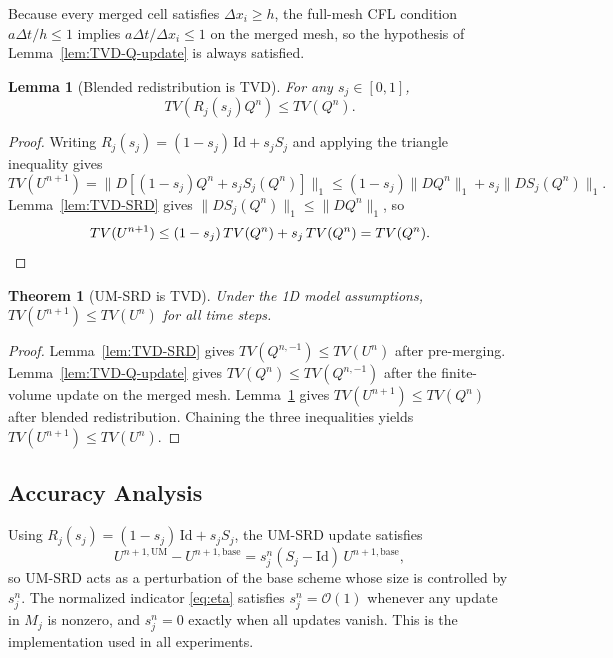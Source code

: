 \documentclass[11pt]{article}
\newtheorem{theorem}{Theorem}
\newtheorem{lemma}{Lemma}
\begin{document}
Because every merged cell satisfies $\Delta x_i \ge h$, the full-mesh CFL
condition $a\Delta t/h \le 1$ implies $a\Delta t/\Delta x_i \le 1$ on the
merged mesh, so the hypothesis of Lemma~\ref{lem:TVD-Q-update} is always
satisfied.

\begin{lemma}[Blended redistribution is TVD]
\label{lem:TVD-R}
For any $s_j \in [0,1]$,
\[
  TV\!\left(R_j(s_j) Q^n\right) \le TV(Q^n).
\]
\end{lemma}

\begin{proof}
Writing $R_j(s_j) = (1-s_j)\,\mathrm{Id} + s_j S_j$ and applying the 
triangle inequality gives
\[
  TV(U^{n+1})
  = \|D[(1-s_j)Q^n + s_j S_j(Q^n)]\|_1
  \le (1-s_j)\|DQ^n\|_1 + s_j\|DS_j(Q^n)\|_1.
\]
Lemma~\ref{lem:TVD-SRD} gives $\|DS_j(Q^n)\|_1 \le \|DQ^n\|_1$, so
\[
  TV(U^{n+1}) \le (1-s_j)\,TV(Q^n) + s_j\,TV(Q^n) = TV(Q^n). \qedhere
\]
\end{proof}

\begin{theorem}[UM-SRD is TVD]
\label{thm:TVD-UMSRD}
Under the 1D model assumptions, $TV(U^{n+1}) \le TV(U^n)$ for all time
steps.
\end{theorem}

\begin{proof}
Lemma~\ref{lem:TVD-SRD} gives $TV(Q^{n,-1}) \le TV(U^n)$ after 
pre-merging. Lemma~\ref{lem:TVD-Q-update} gives $TV(Q^n) \le 
TV(Q^{n,-1})$ after the finite-volume update on the merged mesh. 
Lemma~\ref{lem:TVD-R} gives $TV(U^{n+1}) \le TV(Q^n)$ after blended 
redistribution. Chaining the three inequalities yields $TV(U^{n+1}) \le 
TV(U^n)$.
\end{proof}

\subsection{Accuracy Analysis}
\label{sec:accuracy}

Using $R_j(s_j) = (1-s_j)\,\mathrm{Id} + s_j S_j$, the UM-SRD update 
satisfies
\begin{equation}
  U^{n+1,\mathrm{UM}} - U^{n+1,\mathrm{base}}
  = s_j^n (S_j - \mathrm{Id})\, U^{n+1,\mathrm{base}},
  \label{eq:perturbation}
\end{equation}
so UM-SRD acts as a perturbation of the base scheme whose size is controlled 
by $s_j^n$. The normalized indicator \eqref{eq:eta} satisfies 
$s_j^n = \mathcal{O}(1)$ whenever any update in $M_j$ is nonzero, and 
$s_j^n = 0$ exactly when all updates vanish. This is the implementation used 
in all experiments.
\end{document}
